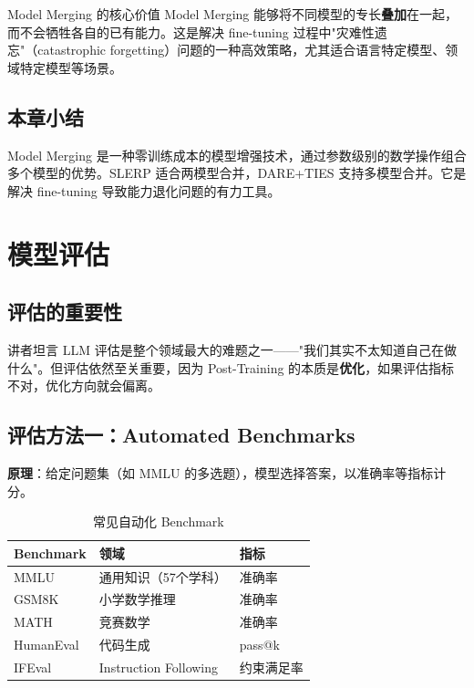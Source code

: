 \documentclass[a4paper]{article}
\begin{document}
\begin{importantbox}{Model Merging 的核心价值}
Model Merging 能够将不同模型的专长\textbf{叠加}在一起，而不会牺牲各自的已有能力。这是解决 fine-tuning 过程中"灾难性遗忘"（catastrophic forgetting）问题的一种高效策略，尤其适合语言特定模型、领域特定模型等场景。
\end{importantbox}

\subsection{本章小结}

Model Merging 是一种零训练成本的模型增强技术，通过参数级别的数学操作组合多个模型的优势。SLERP 适合两模型合并，DARE+TIES 支持多模型合并。它是解决 fine-tuning 导致能力退化问题的有力工具。

\newpage
\section{模型评估}

\subsection{评估的重要性}

讲者坦言 LLM 评估是整个领域最大的难题之一——"我们其实不太知道自己在做什么"。但评估依然至关重要，因为 Post-Training 的本质是\textbf{优化}，如果评估指标不对，优化方向就会偏离。

\subsection{评估方法一：Automated Benchmarks}

\textbf{原理}：给定问题集（如 MMLU 的多选题），模型选择答案，以准确率等指标计分。

\begin{table}[H]
\centering
\caption{常见自动化 Benchmark}
\begin{tabular}{lll}
\toprule
\textbf{Benchmark} & \textbf{领域} & \textbf{指标} \\
\midrule
MMLU & 通用知识（57个学科） & 准确率 \\
GSM8K & 小学数学推理 & 准确率 \\
MATH & 竞赛数学 & 准确率 \\
HumanEval & 代码生成 & pass@k \\
IFEval & Instruction Following & 约束满足率 \\
\bottomrule
\end{tabular}
\end{table}
\end{document}
